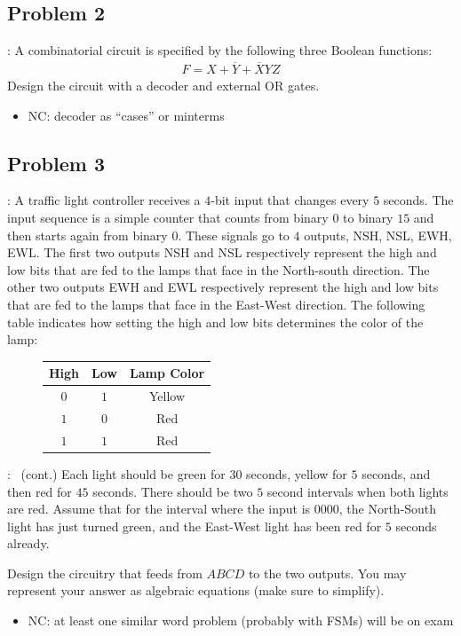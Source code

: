 \documentclass{../slides}
\begin{document}
\subsection{Problem 2}
\begin{frame}{\secname: \subsecname}
    A combinatorial circuit is specified by the following three Boolean functions:
    \begin{gather*}
        F = X + \overbar{Y} + \overbar{X}YZ
    \end{gather*}
    Design the circuit with a decoder and external OR gates.
    \begin{itemize}
        \item NC: decoder as \enquote{cases} or minterms
    \end{itemize}
\end{frame}

\subsection{Problem 3}
\begin{frame}{\secname: \subsecname}
    A traffic light controller receives a $4$-bit input that changes every $5$ seconds. The input sequence is a simple counter that counts from binary $0$ to binary $15$ and then starts again from binary $0$. These signals go to $4$ outputs, NSH, NSL, EWH, EWL. The first two outputs NSH and NSL respectively represent the high and low bits that are fed to the lamps that face in the North-south direction. The other two outputs EWH and EWL respectively represent the high and low bits that are fed to the lamps that face in the East-West direction. The following table indicates how setting the high and low bits determines the color of the lamp:
    \begin{figure}[H]
        \centering
        \begin{tabular}{cc|c}
            High & Low & Lamp Color \\ \hline 
            $0$ & $1$ & Yellow \\
            $1$ & $0$ & Red \\
            $1$ & $1$ & Red
        \end{tabular}
    \end{figure}
\end{frame}

\begin{frame}{\secname: \subsecname\ (cont.)}
    Each light should be green for $30$ seconds, yellow for $5$ seconds, and then red for $45$ seconds. There should be two $5$ second intervals when both lights are red. Assume that for the interval where the input is $0000$, the North-South light has just turned green, and the East-West light has been red for $5$ seconds already.

    Design the circuitry that feeds from $ABCD$ to the two outputs. You may represent your answer as algebraic equations (make sure to simplify).
    \begin{itemize}
        \item NC: at least one similar word problem (probably with FSMs) will be on exam
    \end{itemize}
\end{frame}
\end{document}
